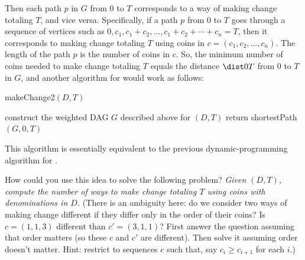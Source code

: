 Then each path $p$ in $G$ from 0 to $T$
corresponds to a way of making change totaling $T$, and vice versa.
Specifically, if a path $p$ from 0 to $T$ goes through
a sequence of vertices such as
$0, c_1, c_1+c_2, \ldots, c_1+c_2+\cdots+c_n = T$,
then it corresponds to making change totaling $T$
using coins in $c=(c_1, c_2, \ldots, c_n)$.
The length of the path $p$ is the number of coins in $c$.
So, the minimum number of coins needed to make change totaling $T$
equals the distance $\dist 0 T$ from 0 to $T$ in $G$,
and another algorithm for  would work as follows:
\begin{myframed}
  \begin{steps}
  \item[]
    \textsf{makeChange2}$(D, T)$
    
    \step construct the weighted DAG $G$ described above for $(D, T)$
    \step return \textsf{shortestPath}$(G, 0, T)$
  \end{steps}
\end{myframed}

This algorithm is essentially equivalent to the previous dynamic-programming algorithm
for .


How could you use this idea to solve the following problem?
\emph{Given $(D, T)$, compute the \emph{number of ways} to make change totaling $T$
using coins with denominations in $D$.}
(There is an ambiguity here: do we consider two ways of making change
different if they differ only in the order of their coins?
Is $c=(1, 1, 3)$ different than $c'=(3, 1, 1)$?
First answer the question assuming that order matters (so these $c$ and $c'$ are different).
Then solve it assuming order doesn't matter.
Hint: restrict to sequences $c$ such that, say $c_i \ge c_{i+1}$ for each $i$.)


